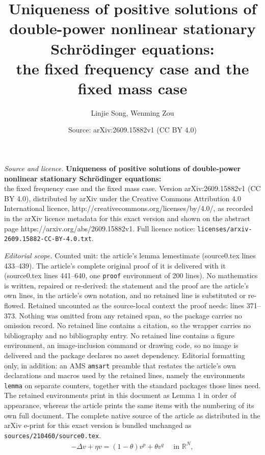 \documentclass[10pt,a4paper]{amsart}
\title{{\bf Uniqueness of positive solutions of double-power nonlinear stationary Schr\"odinger equations:} \\the fixed frequency case and the fixed mass case}
\author{Linjie Song, Wenming Zou}
\date{Source: arXiv:2609.15882v1 (CC BY 4.0)}
\newcommand{\R}{\mathbb{R}}
\begin{document}
\maketitle

\noindent\emph{Source and licence.} {\bf Uniqueness of positive solutions of double-power nonlinear stationary Schr\"odinger equations:} \\the fixed frequency case and the fixed mass case. Version arXiv:2609.15882v1 (CC BY 4.0), distributed by arXiv under the Creative Commons Attribution 4.0 International licence, http://creativecommons.org/licenses/by/4.0/, as recorded in the arXiv licence metadata for this exact version and shown on the abstract page https://arxiv.org/abs/2609.15882v1. Full licence notice: \texttt{licenses/arxiv-2609.15882-CC-BY-4.0.txt}.\par\smallskip

\noindent\textit{Editorial scope.} Counted unit: the article's lemma lemestimate (source0.tex lines 433--439). The article's complete original proof of it is delivered with it (source0.tex lines 441--640, one \texttt{proof} environment of 200 lines). No mathematics is written, repaired or re-derived: the statement and the proof are the article's own lines, in the article's own notation, and no retained line is substituted or re-flowed.  Retained uncounted as the source-local context the proof needs: lines 371--373.  Nothing was omitted from any retained span, so the package carries no omission record.  No retained line contains a citation, so the wrapper carries no bibliography and no bibliography entry.  No retained line contains a figure environment, an image-inclusion command or drawing code, so no image is delivered and the package declares no asset dependency.  Editorial formatting only, in addition: an AMS \texttt{amsart} preamble that restates the article's own declarations and macros used by the retained lines, namely the environments \texttt{lemma} on separate counters, together with the standard packages those lines need.  The retained environments print in this document as Lemma 1 in order of appearance, whereas the article prints the same items with the numbering of its own full document.  The complete native source of the article as distributed in the arXiv e-print for this exact version is bundled unchanged as \texttt{sources/210460/source0.tex}.
	\begin{align} \label{eqofv}
		-\Delta v + \eta v = (1-\theta)v^p + \theta v^q \quad \text{ in } \R^N,
	\end{align}
\end{document}
